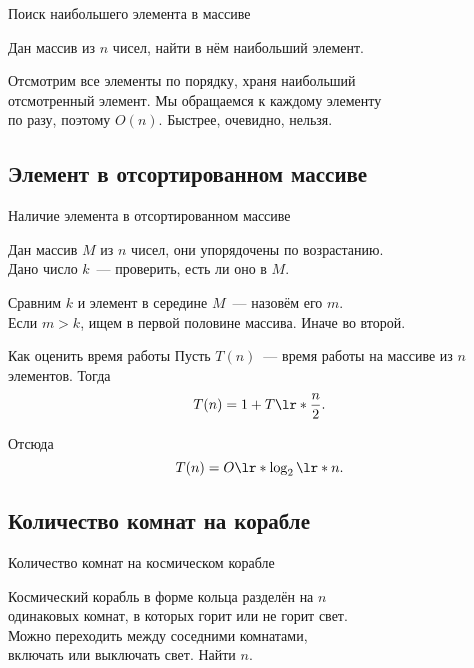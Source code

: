 \begin{frame}{Поиск наибольшего элемента в массиве} \ \\
\begin{task}
	Дан массив из \(n\) чисел, найти в нём наибольший элемент.
\end{task}

Отсмотрим все элементы по порядку, храня наибольший \\
отсмотренный элемент. Мы обращаемся к каждому элементу \\
по разу, поэтому \(O(n)\). Быстрее, очевидно, нельзя.
	
\end{frame}

\subsection{Элемент в отсортированном массиве}

\begin{frame}{Наличие элемента в отсортированном массиве} \ \\
\begin{task}
	Дан массив \(M\) из \(n\) чисел, они упорядочены по возрастанию. \\
	Дано число \(k\)~— проверить, есть ли оно в \(M\).
\end{task}

Сравним \(k\) и элемент в середине \(M\)~— назовём его \(m\). \\
Если \(m>k\), ищем в первой половине массива. Иначе во второй.
	
\end{frame}

\begin{frame}{Как оценить время работы}
	Пусть \(T(n)\)~— время работы на массиве из \(n\) элементов. Тогда
	\[ T(n) = 1 + T\lr*{\frac{n}{2}}.\]

	Отсюда \[ T(n) = O\lr*{\log_2 \lr*{n}}.\]
\end{frame}

\subsection{Количество комнат на корабле}

\begin{frame}{Количество комнат на космическом корабле} \ \\
\begin{task}
	Космический корабль в форме кольца разделён на \(n\) \\
	одинаковых комнат, в которых горит или не горит свет. \\
	Можно переходить между соседними комнатами, \\
	включать или выключать свет. Найти \(n\).
\end{task} \medskip

\begin{center}  \end{center}
\end{frame}


